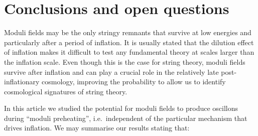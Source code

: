 \documentclass[12pt]{article}
\begin{document}
\section{Conclusions and open questions}
\label{sec:conclusions}

Moduli fields may be the only stringy remnants that survive at low energies and particularly after a period of inflation. It is usually stated that the dilution effect of inflation makes it difficult to test any fundamental theory at scales larger than the inflation scale. Even though this is the case for string theory, moduli fields survive after inflation and can play a crucial role in the relatively late post-inflationary cosmology, improving the probability to allow us to identify cosmological signatures of string theory. 

In this article we studied the potential for moduli fields to produce oscillons during ``moduli preheating'', i.e.\ independent of the particular mechanism that drives inflation. We may summarise our results stating that:
\end{document}
